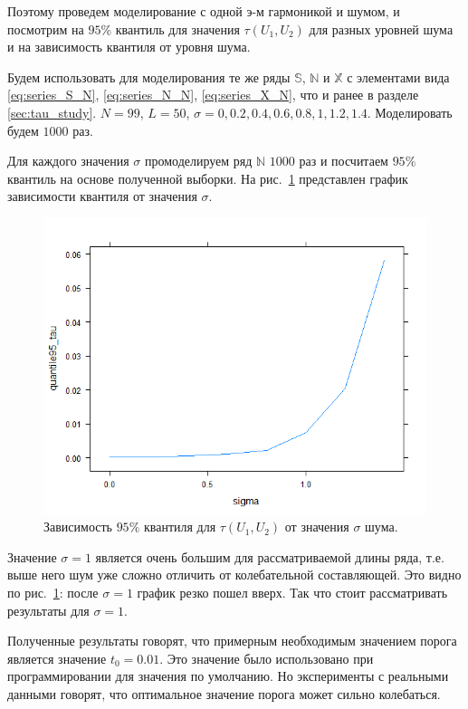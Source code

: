 \documentclass[specialist,
               substylefile = spbu.rtx,
               subf,href,colorlinks=true, 12pt]{disser}
\begin{document}
Поэтому проведем моделирование с одной э-м гармоникой и шумом, и посмотрим на $95\%$ квантиль для значения $\tau(U_1, U_2)$ для разных уровней шума и на зависимость квантиля от уровня шума.

Будем использовать для моделирования те же ряды $\mathbb{S}$, $\mathbb{N}$ и $\mathbb{X}$ с элементами вида
\eqref{eq:series_S_N}, \eqref{eq:series_N_N}, \eqref{eq:series_X_N}, что и ранее в разделе \ref{sec:tau_study}.
$N = 99$, $L = 50$, $\sigma = 0, 0.2, 0.4, 0.6, 0.8, 1, 1.2, 1.4$. Моделировать будем $1000$ раз.

Для каждого значения $\sigma$ промоделируем ряд $\mathbb{N}$ $1000$ раз и посчитаем $95\%$ квантиль на основе полученной выборки. На рис.~\ref{fig:q95_tau1} представлен график зависимости квантиля от значения $\sigma$.
\begin{figure}[!hhh]
	\begin{center}
	\includegraphics[width = 4.5in]{q95_tau1}
	\end{center}
	\caption{Зависимость $95\%$ квантиля для $\tau(U_1, U_2)$ от значения $\sigma$ шума.}
	\label{fig:q95_tau1}
\end{figure}

Значение $\sigma = 1$ является очень большим для рассматриваемой длины ряда, т.е. выше него шум уже сложно отличить от колебательной составляющей. Это видно по рис.~\ref{fig:q95_tau1}: после $\sigma=1$ график резко пошел вверх. Так что стоит рассматривать результаты для $\sigma=1$.

Полученные результаты говорят, что примерным необходимым значением порога является значение $t_0 = 0.01$.
Это значение было использовано при программировании для значения по умолчанию. Но эксперименты с реальными данными говорят, что оптимальное значение порога может сильно колебаться.
\end{document}
